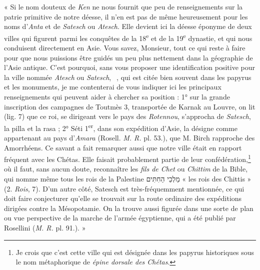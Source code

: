 \documentclass{article}
\newcommand*\hieroAAAG{}
\newcommand*\hieroAAAH{}
\newcommand*\hieroAADV{}
\begin{document}
« Si le nom douteux de \emph{Ken} ne nous fournit que peu de renseignements sur la patrie primitive de notre déesse, il n'en est pas de même heureusement pour les noms d'\emph{Anta} et de \emph{Satesch} ou \emph{Atesch}. Elle devient ici la déesse éponyme de deux villes qui figurent parmi les conquêtes de la 18\textsuperscript{e} et de la 19\textsuperscript{e} dynastie, et qui nous conduisent directement en Asie. Vous savez, Monsieur, tout ce qui reste à faire pour que nous puissions être guidés un peu plus nettement dans la géographie de l'Asie antique. C'est pourquoi, sans vous proposer une identification positive pour la ville nommée \emph{Atesch} ou \emph{Satesch}, $\hieroAAAG\:\hieroAAAH\:\hieroAADV$, qui est citée bien souvent dans les papyrus et les monuments, je me contenterai de vous indiquer ici les principaux renseignements qui peuvent aider à chercher sa position : 1° sur la grande inscription des campagnes de Toutmès 3, transportée de Karnak au Louvre, on lit (lig. 7) que ce roi, se dirigeant vers le pays des \emph{Rotennou}, s'approcha de \emph{Satesch}, la pilla et la rasa ; 2° Séti 1\textsuperscript{er}, dans son expédition d'Asie, la désigne comme appartenant au pays d'\emph{Amara} (Rosell. \emph{M. R.} pl. 53.), que M. Birch rapproche des Amorrhéens. Ce savant a fait remarquer aussi que notre ville était en rapport fréquent avec les Chétas. Elle faisait probablement partie de leur confédération,\footnote{Je crois que c'est cette ville qui est désignée dans les papyrus historiques sous le nom métaphorique de \emph{épine dorsale des Chétas}.} où il faut, sans aucun doute, reconnaître les \emph{fils de Chet} ou \emph{Chittim} de la Bible, qui nomme même tous les rois de la Palestine \texthebrew{מַלְכֵי הַחִתִּים} « les rois des Chittis » (2. \emph{Rois}, 7). D'un autre côté, Satesch est très-fréquemment mentionnée, ce qui doit faire conjecturer qu'elle se trouvait sur la route ordinaire des expéditions dirigées contre la Mésopotamie. On la trouve aussi figurée dans une sorte de plan ou vue perspective de la marche de l'armée égyptienne, qui a été publié par Rosellini (\emph{M. R.} pl. 91.). »
\end{document}
